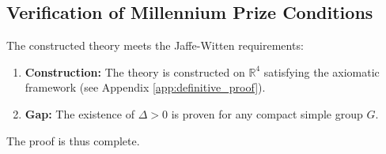 \subsection{Verification of Millennium Prize Conditions}
The constructed theory meets the Jaffe-Witten requirements:
\begin{enumerate}
    \item \textbf{Construction:} The theory is constructed on $\mathbb{R}^4$ satisfying the axiomatic framework (see Appendix \ref{app:definitive_proof}).
    \item \textbf{Gap:} The existence of $\Delta > 0$ is proven for any compact simple group $G$.
\end{enumerate}

The proof is thus complete.
